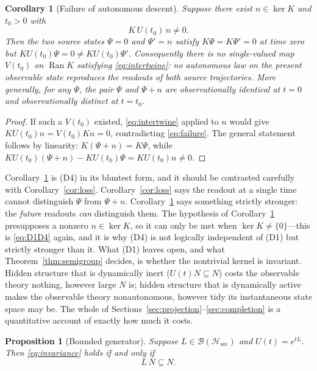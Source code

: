 \documentclass[11pt,reqno]{amsart}
\numberwithin{equation}{section}
\theoremstyle{plain}
\newtheorem{proposition}[theorem]{Proposition}
\newtheorem{corollary}[theorem]{Corollary}
\theoremstyle{definition}
\theoremstyle{remark}
\newcommand{\Hsrc}{\mathcal{H}_{\mathrm{src}}}
\newcommand{\Ran}{\operatorname{Ran}}
\begin{document}
\begin{corollary}[Failure of autonomous descent]
\label{cor:failure}
Suppose there exist $n\in\ker K$ and $t_{0}>0$ with
\begin{equation}
\label{eq:failure}
K\,U(t_{0})\,n\neq0 .
\end{equation}
Then the two source states $\Psi=0$ and $\Psi'=n$ satisfy $K\Psi=K\Psi'=0$ at time zero but
$K U(t_{0})\Psi=0\neq KU(t_{0})\Psi'$. Consequently there is \emph{no} single-valued map
$V(t_{0})$ on $\Ran K$ satisfying \eqref{eq:intertwine}: no autonomous law on the present
observable state reproduces the readouts of both source trajectories. More generally, for
\emph{any} $\Psi$, the pair $\Psi$ and $\Psi+n$ are observationally identical at $t=0$ and
observationally distinct at $t=t_{0}$.
\end{corollary}

\begin{proof}
If such a $V(t_{0})$ existed, \eqref{eq:intertwine} applied to $n$ would give
$KU(t_{0})n=V(t_{0})Kn=0$, contradicting \eqref{eq:failure}. The general statement follows
by linearity: $K(\Psi+n)=K\Psi$, while
$KU(t_{0})(\Psi+n)-KU(t_{0})\Psi=KU(t_{0})n\neq0$.
\end{proof}

Corollary~\ref{cor:failure} is (D4) in its bluntest form, and it should be contrasted
carefully with Corollary~\ref{cor:loss}. Corollary~\ref{cor:loss} says the readout at a
single time cannot distinguish $\Psi$ from $\Psi+n$. Corollary~\ref{cor:failure} says
something strictly stronger: the \emph{future} readouts \emph{can} distinguish them. The
hypothesis of Corollary~\ref{cor:failure} presupposes a nonzero $n\in\ker K$, so it can only
be met when $\ker K\neq\{0\}$---this is \eqref{eq:D1D4} again, and it is why (D4) is not
logically independent of (D1) but strictly stronger than it. What (D1) leaves open, and what
Theorem~\ref{thm:semigroup} decides, is whether the nontrivial kernel is invariant. Hidden
structure that is dynamically inert ($U(t)N\subseteq N$) costs the observable theory nothing,
however large $N$ is; hidden structure that is dynamically active makes the observable theory
nonautonomous, however tidy its instantaneous state space may be. The whole of
Sections~\ref{sec:projection}--\ref{sec:completion} is a quantitative account of exactly
how much it costs.

\begin{proposition}[Bounded generator]
\label{prop:bddgen}
Suppose $L\in\mathcal{B}(\Hsrc)$ and $U(t)=e^{tL}$. Then \eqref{eq:invariance} holds if and
only if
\begin{equation}
\label{eq:LNN}
L\,N\subseteq N .
\end{equation}
\end{proposition}
\end{document}
